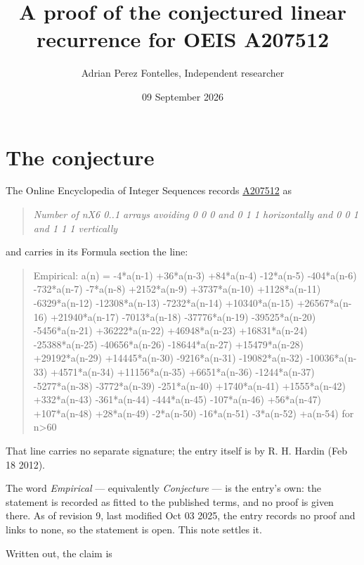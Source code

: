 \documentclass[11pt]{article}
\title{A proof of the conjectured linear recurrence for OEIS A207512}
\author{Adrian Perez Fontelles, Independent researcher}
\date{09 September 2026}
\theoremstyle{definition}
\begin{document}
\maketitle
\section{The conjecture}

The Online Encyclopedia of Integer Sequences records \href{https://oeis.org/A207512}{A207512} as

\begin{quote}\itshape Number of nX6 0..1 arrays avoiding 0 0 0 and 0 1 1 horizontally and 0 0 1 and 1 1 1 vertically\end{quote}

and carries in its Formula section the line:

\begin{quote}\ttfamily Empirical: a(n) = -4*a(n-1) +36*a(n-3) +84*a(n-4) -12*a(n-5) -404*a(n-6) -732*a(n-7) -7*a(n-8) +2152*a(n-9) +3737*a(n-10) +1128*a(n-11) -6329*a(n-12) -12308*a(n-13) -7232*a(n-14) +10340*a(n-15) +26567*a(n-16) +21940*a(n-17) -7013*a(n-18) -37776*a(n-19) -39525*a(n-20) -5456*a(n-21) +36222*a(n-22) +46948*a(n-23) +16831*a(n-24) -25388*a(n-25) -40656*a(n-26) -18644*a(n-27) +15479*a(n-28) +29192*a(n-29) +14445*a(n-30) -9216*a(n-31) -19082*a(n-32) -10036*a(n-33) +4571*a(n-34) +11156*a(n-35) +6651*a(n-36) -1244*a(n-37) -5277*a(n-38) -3772*a(n-39) -251*a(n-40) +1740*a(n-41) +1555*a(n-42) +332*a(n-43) -361*a(n-44) -444*a(n-45) -107*a(n-46) +56*a(n-47) +107*a(n-48) +28*a(n-49) -2*a(n-50) -16*a(n-51) -3*a(n-52) +a(n-54) for n>60\end{quote}

That line carries no separate signature; the entry itself is by R. H. Hardin (Feb 18 2012).

The word {\itshape Empirical} --- equivalently {\itshape Conjecture} --- is the entry's own: the statement is recorded as fitted to the published terms, and no proof is given there. As of revision 9, last modified Oct 03 2025, the entry records no proof and links to none, so the statement is open. This note settles it.

Written out, the claim is
\end{document}
